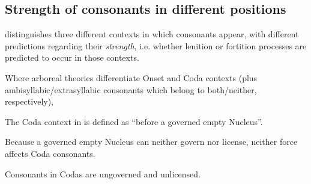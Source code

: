 \subsection{Strength of consonants in different positions}

\CVCV distinguishes three different contexts in which consonants appear,
with different predictions regarding their \emph{strength},
i.e. whether lenition or fortition processes are predicted to occur
in those contexts.

Where arboreal theories differentiate Onset and Coda contexts
(plus ambisyllabic/extrasyllabic consonants which belong to both/neither,
respectively), \TODO{}



The Coda context in \CVCV is defined as
\enquote{before a governed empty Nucleus}.

Because a governed empty Nucleus can neither govern nor license,
neither force affects Coda consonants.

Consonants in Codas are ungoverned and unlicensed. \parencite[p.~659]{scheer2004}
